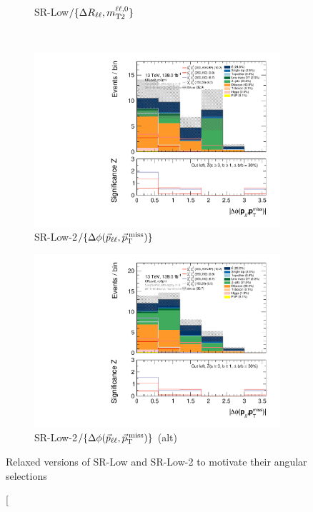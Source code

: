 \begin{figure}[tp]
\begin{subfigure}{0.48\textwidth}
\caption{SR-Low$/\{\Delta R_{\ell\ell},m_\mathrm{T2}^{\ell\ell,0}\}$}
\label{fig:2ljets_low_minus_norll_nomt2_mt2}
\end{subfigure}
\\[0.5em]
\begin{subfigure}{0.48\textwidth}
\centering
\includegraphics[width=\textwidth]{figures/2ljets_low_absdPhiPllMet_SRLow2_noDphi.pdf}
\caption{SR-Low-2$/\{\Delta\phi(\vec p_{\ell\ell}, \vec p_\mathrm{T}^\mathrm{\:miss})\}$}
\label{fig:2ljets_low_minus_dphi}
\end{subfigure}
\hfill
\begin{subfigure}{0.48\textwidth}
\centering
\includegraphics[width=\textwidth]{figures/2ljets_low_absdPhiPllMet_SRLow2_noDphi_mg5.pdf}
\caption{SR-Low-2$/\{\Delta\phi(\vec p_{\ell\ell}, \vec p_\mathrm{T}^\mathrm{\:miss})\}$ (alt)}
\label{fig:2ljets_low_minus_dphi_alt}
\end{subfigure}
\caption[
Relaxed versions of SR-Low and SR-Low-2 to motivate their angular selections

\end{figure}
